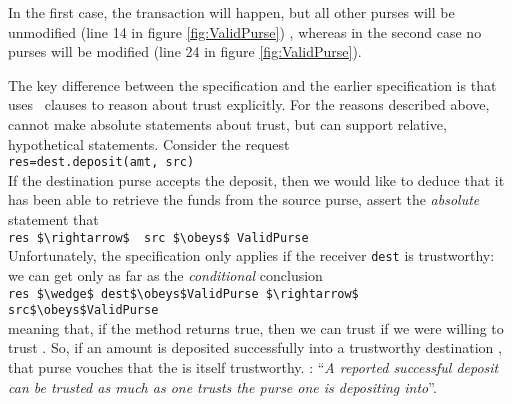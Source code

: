 In the first case, the transaction will happen, but
all other purses will be unmodified (line 14 in figure \ref{fig:ValidPurse}) , whereas in the second case no
purses will be modified (line 24 in figure \ref{fig:ValidPurse}). 

\vspace{.02in}
The key difference between the  specification and the
earlier  specification is that  uses
\obeys\ clauses to reason about trust explicitly.  For the reasons
described above,  cannot make absolute statements
about trust, but can support relative, hypothetical statements.
%
Consider the request\\ %
%
\SP  \lstinline+res=dest.deposit(amt, src)+\\
%
If the destination purse accepts the deposit, then   %
we would like to deduce that it has been   able to retrieve the funds
from the source purse, 
  assert the {\em absolute} statement that \\
%
\SP   \lstinline+res $\rightarrow$  src $\obeys$ ValidPurse+\\
%
Unfortunately, the  specification %
only
applies if the receiver \lstinline+dest+ is trustworthy: we can get
only as far as the %
{\em conditional} conclusion\\
%
\SP  \lstinline+res $\wedge$ dest$\obeys$ValidPurse $\rightarrow$ src$\obeys$ValidPurse+\\
%
meaning that, if the  method returns true, then we can
trust  if we were willing to trust .
\noindent So, if an amount is deposited successfully into a
trustworthy destination , that purse vouches that the
 is itself trustworthy. 
 \cite{ELang}:
``\textit{A reported successful deposit can be trusted as much as one
  trusts the purse one is depositing into}''. 

